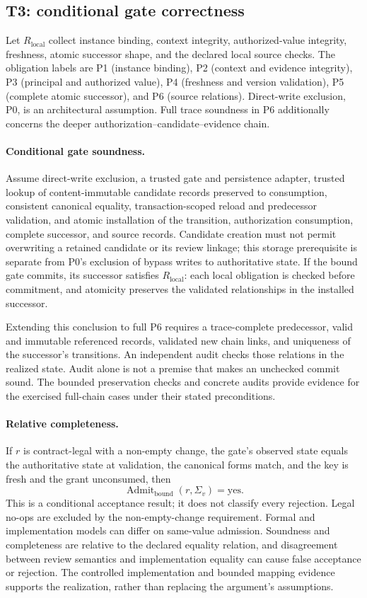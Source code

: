 \subsection{T3: conditional gate correctness}
\label{app:t3}
Let $R_{\mathrm{local}}$ collect instance binding, context integrity, authorized-value integrity, freshness, atomic successor shape, and the declared local source checks. The obligation labels are P1 (instance binding), P2 (context and evidence integrity), P3 (principal and authorized value), P4 (freshness and version validation), P5 (complete atomic successor), and P6 (source relations). Direct-write exclusion, P0, is an architectural assumption. Full trace soundness in P6 additionally concerns the deeper authorization--candidate--evidence chain.

\paragraph{Conditional gate soundness.}
Assume direct-write exclusion, a trusted gate and persistence adapter, trusted lookup of content-immutable candidate records preserved to consumption, consistent canonical equality, transaction-scoped reload and predecessor validation, and atomic installation of the transition, authorization consumption, complete successor, and source records. Candidate creation must not permit overwriting a retained candidate or its review linkage; this storage prerequisite is separate from P0's exclusion of bypass writes to authoritative state. If the bound gate commits, its successor satisfies $R_{\mathrm{local}}$: each local obligation is checked before commitment, and atomicity preserves the validated relationships in the installed successor.

Extending this conclusion to full P6 requires a trace-complete predecessor, valid and immutable referenced records, validated new chain links, and uniqueness of the successor's transitions. An independent audit checks those relations in the realized state. Audit alone is not a premise that makes an unchecked commit sound. The bounded preservation checks and concrete audits provide evidence for the exercised full-chain cases under their stated preconditions.

\paragraph{Relative completeness.}
If $r$ is contract-legal with a non-empty change, the gate's observed state equals the authoritative state at validation, the canonical forms match, and the key is fresh and the grant unconsumed, then
\[
 \operatorname{Admit}_{\mathrm{bound}}(r,\Sigma_v)=\mathrm{yes}.
\]
This is a conditional acceptance result; it does not classify every rejection. Legal no-ops are excluded by the non-empty-change requirement. Formal and implementation models can differ on same-value admission. Soundness and completeness are relative to the declared equality relation, and disagreement between review semantics and implementation equality can cause false acceptance or rejection. The controlled implementation and bounded mapping evidence supports the realization, rather than replacing the argument's assumptions.

